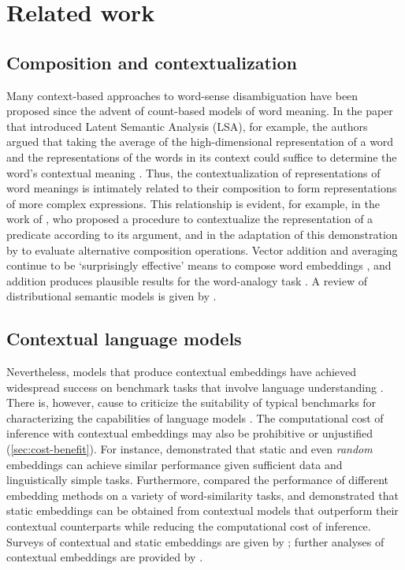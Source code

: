 \section{Related work}
\label{sec:related-work}

\subsection{Composition and contextualization}

Many context-based approaches to word-sense disambiguation have been proposed since the
advent of count-based models of word meaning.
In the paper that introduced Latent Semantic Analysis (LSA), for example, the authors
argued that taking the average of the high-dimensional representation of a word and the
representations of the words in its context could suffice to determine the word's
contextual meaning \parencite[229-230]{Landauer1997}.
Thus, the contextualization of representations of word meanings is intimately related
to their composition to form representations of more complex expressions.
This relationship is evident, for example, in the work of \textcite{Kintsch2001}, who
proposed a procedure to contextualize the representation of a predicate according to
its argument, and in the adaptation of this demonstration by \textcite{Mitchell2008} to
evaluate alternative composition operations.
Vector addition and averaging continue to be `surprisingly effective' means to compose
word embeddings \parencite[10]{Boleda2020}, and addition produces plausible results for
the word-analogy task \parencites[e.g.,][9]{Mikolov2013}[7]{Mikolov2013a}.
A review of distributional semantic models is given by \textcite{Lenci2018}.

\subsection{Contextual language models}

Nevertheless, models that produce contextual embeddings have achieved widespread
success on benchmark tasks that involve language understanding
\parencite[22-27]{Bommasani2022}.
There is, however, cause to criticize the suitability of typical benchmarks for
characterizing the capabilities of language models \parencite[5-6]{Srivastava2023}.
The computational cost of inference with contextual embeddings may also be prohibitive
or unjustified (\cref{sec:cost-benefit}).
For instance, \textcite{Arora2020} demonstrated that static and even \emph{random}
embeddings can achieve similar performance given sufficient data and linguistically
simple tasks.
Furthermore, \textcites[5244-5246]{Gupta2019}[4760-4762]{Bommasani2020} compared the
performance of different embedding methods on a variety of word-similarity tasks, and
demonstrated that static embeddings can be obtained from contextual models that
outperform their contextual counterparts while reducing the computational cost of
inference.
Surveys of contextual and static embeddings are given by
\textcites{Liu2020}{Torregrossa2021}; further analyses of contextual embeddings are
provided by \textcites{Hewitt2019}{Liu2019}{Reif2019}{Brunner2019}.

